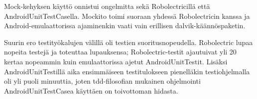 Mock-kehyksen käyttö onnistui ongelmitta sekä Robolectricillä että AndroidUnitTestCasella. Mockito toimi suoraan yhdessä Robolectricin kanssa ja Android-emulaattorissa ajaminenkin vaati vain erillisen dalvik-käännöspaketin.

Suurin ero testityökalujen välillä oli testien suoritusnopeudella. Robolectric lupaa nopeita testejä ja toteuttaa lupauksensa; Robolectric-testit ajautuivat yli 20 kertaa nopeammin kuin emulaattorissa ajetut AndroidUnitTestit. Lisäksi AndroidUnitTestillä aika ensimmäiseen testitulokseen pienelläkin testiohjelmalla oli yli puoli minuuttia, joten tdd-filosofian mukainen ohjelmointi AndroidUnitTestCasea käyttäen on toivottoman hidasta.